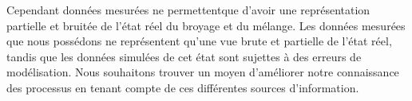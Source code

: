 Cependant données mesurées ne permettentque d'avoir une représentation partielle et bruitée de l'état réel du broyage et du mélange. Les données mesurées que nous possédons ne représentent qu'une vue brute et partielle de l'état réel, tandis que les données simulées de cet état sont sujettes à des erreurs de modélisation. Nous souhaitons trouver un moyen d'améliorer notre connaissance des processus en tenant compte de ces différentes sources d'information.




